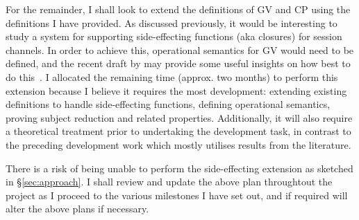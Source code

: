 \documentclass{mprop}
\begin{document}
For the remainder, I shall look to extend the definitions of GV and CP using
the definitions I have provided. As discussed previously, it would be
interesting to study a system for supporting side-effecting functions (aka
closures) for session channels. In order to achieve this, operational
semantics for GV would need to be defined, and the recent draft by
\citeauthor{Lindley:2014:SPS} may provide some useful insights on how best to
do this~\cite{Lindley:2014:SPS}. I allocated the remaining time (approx. two
months) to perform this extension because I believe it requires the most
development: extending existing definitions to handle side-effecting
functions, defining operational semantics, proving subject reduction and
related properties. Additionally, it will also require a theoretical treatment
prior to undertaking the development task, in contrast to the preceding
development work which mostly utilises results from the literature.

There is a risk of being unable to perform the side-effecting extension as
sketched in \S \ref{sec:approach}. I shall review and update the above plan
throughtout the project as I proceed to the various milestones I have set out,
and if required will alter the above plans if necessary.


\printbibliography
\end{document}
